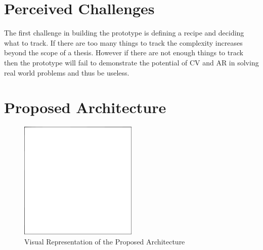 \section{Perceived Challenges} \label{challenges}

The first challenge in building the prototype is defining a recipe and 
deciding what to track. If there are too many things to track the complexity 
increases beyond the scope of a thesis. However if there are not enough 
things to track then the prototype will fail to demonstrate the potential of 
CV and AR in solving real world problems and thus be useless.

\section{Proposed Architecture} \label{arch}

\begin{figure}
\centering \includegraphics[width=0.5\textwidth]{kuvat/placeholder.png}
\caption{Visual Representation of the Proposed Architecture}
\label{Arch fig} 
\end{figure}
